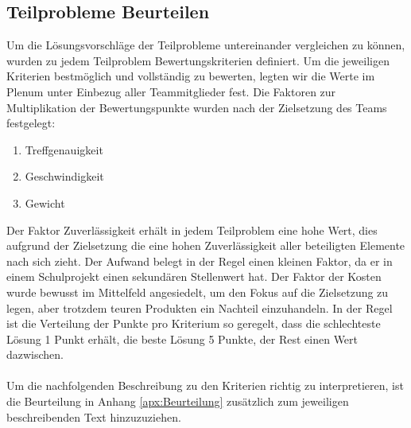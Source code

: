 	\subsection{Teilprobleme Beurteilen}
		Um die Lösungsvorschläge der Teilprobleme untereinander vergleichen zu können, wurden zu jedem Teilproblem Bewertungskriterien definiert. Um die jeweiligen Kriterien bestmöglich und vollständig zu bewerten, legten wir die Werte im Plenum unter Einbezug aller Teammitglieder fest.
		Die Faktoren zur Multiplikation der Bewertungspunkte wurden nach der Zielsetzung des Teams festgelegt:
		
		\begin{enumerate}
			\item Treffgenauigkeit
			\item Geschwindigkeit
			\item Gewicht
		\end{enumerate}
		Der Faktor Zuverlässigkeit erhält in jedem Teilproblem eine hohe Wert, dies aufgrund der Zielsetzung die eine hohen Zuverlässigkeit aller beteiligten Elemente nach sich zieht. Der Aufwand belegt in der Regel einen kleinen Faktor, da er in einem Schulprojekt einen sekundären Stellenwert hat. Der Faktor der Kosten wurde bewusst im Mittelfeld angesiedelt, um den Fokus auf die Zielsetzung zu legen, aber trotzdem teuren Produkten ein Nachteil einzuhandeln.
		In der Regel ist die Verteilung der Punkte pro Kriterium so geregelt, dass die schlechteste Lösung 1 Punkt erhält, die beste Lösung 5 Punkte, der Rest einen Wert dazwischen.\\
		\\
		Um die nachfolgenden Beschreibung zu den Kriterien richtig zu interpretieren, ist die Beurteilung in Anhang \ref{apx:Beurteilung} zusätzlich zum jeweiligen beschreibenden Text hinzuzuziehen. 
